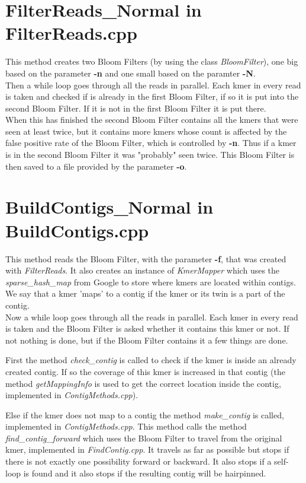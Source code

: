\documentclass[a4paper]{report}
\renewcommand{\b}[1]{\textbf{#1}}  %
\renewcommand{\i}[1]{\textit{#1}}  %
\newcommand{\e}[1]{\emph{#1}}    %
\begin{document}
\section{FilterReads\_Normal in FilterReads.cpp}
This method creates two Bloom Filters (by using the class \i{BloomFilter}), one big based on the parameter 
\b{-n} and one small based on the paramter \b{-N}. \\[4pt]

Then a while loop goes through all the reads in parallel. Each kmer in every read is taken and checked if is already in the first Bloom Filter,
if so it is put into the second Bloom Filter. If it is not in the first Bloom Filter it is put there. \\[4pt]

When this has finished the second Bloom Filter contains all the kmers that were seen at least twice, but it contains more kmers
whose count is affected by the false positive rate of the Bloom Filter, which is controlled by \b{-n}. Thus if a kmer is in the second Bloom Filter it was "probably" seen twice. This Bloom Filter is
then saved to a file provided by the parameter \b{-o}. 


\newpage
\section{BuildContigs\_Normal in BuildContigs.cpp}
This method reads the Bloom Filter, with the parameter \b{-f}, that was created with \i{FilterReads}. It also creates an instance
of \i{KmerMapper} which uses the \i{sparse\_hash\_map} from Google to store where kmers are located within contigs. We say 
that a kmer 'maps' to a contig if the kmer or its twin is a part of the contig. \\[4pt]


Now a while loop goes through all the reads in parallel. Each kmer in every read is taken and the Bloom Filter is asked whether
it contains this kmer or not. If not nothing is done, but if the Bloom Filter contains it a few things are done.

First the method \i{check\_contig} is called to check if the kmer is inside an already created contig. If so the coverage of this kmer
is increased in that contig (the method \i{getMappingInfo} is used to get the correct location inside the contig, implemented in 
\e{ContigMethods.cpp}). 

Else if the kmer does not map to a contig the method \i{make\_contig} is called, implemented in \e{ContigMethods.cpp}. 
This method calls the method \i{find\_contig\_forward} which uses the Bloom Filter to travel from the original kmer, implemented in 
\e{FindContig.cpp}. It travels as far as possible but stops if there is not exactly one possibility forward or backward. 
It also stops if a self-loop is found and it also stops if the resulting contig will be hairpinned.
\end{document}
